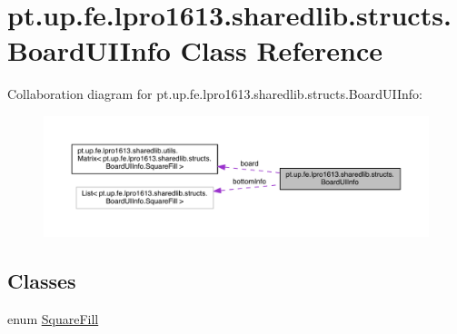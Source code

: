 \hypertarget{classpt_1_1up_1_1fe_1_1lpro1613_1_1sharedlib_1_1structs_1_1_board_u_i_info}{}\section{pt.\+up.\+fe.\+lpro1613.\+sharedlib.\+structs.\+Board\+U\+I\+Info Class Reference}
\label{classpt_1_1up_1_1fe_1_1lpro1613_1_1sharedlib_1_1structs_1_1_board_u_i_info}


Collaboration diagram for pt.\+up.\+fe.\+lpro1613.\+sharedlib.\+structs.\+Board\+U\+I\+Info\+:
\nopagebreak
\begin{figure}[H]
\begin{center}
\leavevmode
\includegraphics[width=350pt]{classpt_1_1up_1_1fe_1_1lpro1613_1_1sharedlib_1_1structs_1_1_board_u_i_info__coll__graph}
\end{center}
\end{figure}
\subsection*{Classes}
\begin{DoxyCompactItemize}
\item 
enum \hyperlink{enumpt_1_1up_1_1fe_1_1lpro1613_1_1sharedlib_1_1structs_1_1_board_u_i_info_1_1_square_fill}{Square\+Fill}
\end{DoxyCompactItemize}
